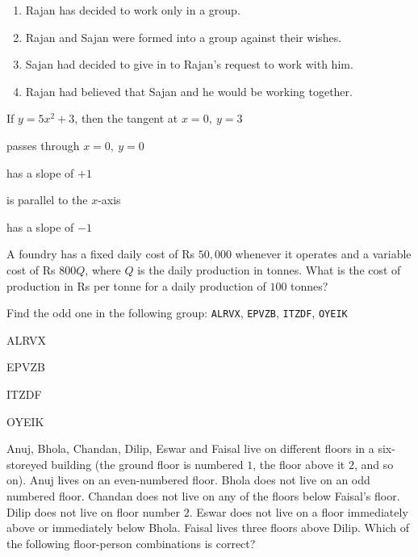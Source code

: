 \documentclass[journal,12pt,onecolumn]{IEEEtran}
\theoremstyle{remark}
\begin{document}
\begin{enumerate}
{{\hfill{}

\begin{enumerate}
\item Rajan has decided to work only in a group.
\item Rajan and Sajan were formed into a group against their wishes.
\item Sajan had decided to give in to Rajan's request to work with him.
\item Rajan had believed that Sajan and he would be working together.
\end{enumerate}

\item If $y=5x^{2}+3$, then the tangent at $x=0,\ y=3$ 

\hfill{}

\begin{enumerate}
\begin{multicols}{2}
\item passes through $x=0,\ y=0$
\item has a slope of $+1$
\item is parallel to the $x$-axis
\item has a slope of $-1$
\end{multicols}
\end{enumerate}

\item A foundry has a fixed daily cost of Rs $50{,}000$ whenever it operates and a variable cost of Rs $800Q$, where $Q$ is the daily production in tonnes. What is the cost of production in Rs per tonne for a daily production of $100$ tonnes?

\hfill{}

\item Find the odd one in the following group: \texttt{ALRVX}, \texttt{EPVZB}, \texttt{ITZDF}, \texttt{OYEIK} \hfill{}
\begin{enumerate}
\begin{multicols}{4}
\item ALRVX
\item EPVZB
\item ITZDF
\item OYEIK
\end{multicols}
\end{enumerate}

\item Anuj, Bhola, Chandan, Dilip, Eswar and Faisal live on different floors in a six-storeyed building (the ground floor is numbered $1$, the floor above it $2$, and so on). Anuj lives on an even-numbered floor. Bhola does not live on an odd numbered floor. Chandan does not live on any of the floors below Faisal's floor. Dilip does not live on floor number $2$. Eswar does not live on a floor immediately above or immediately below Bhola. Faisal lives three floors above Dilip. Which of the following floor-person combinations is correct? 

}}
\end{enumerate}
\end{document}
